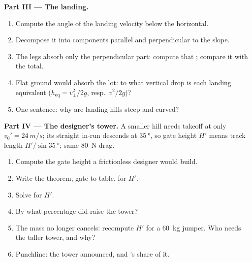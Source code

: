 \begin{problem}
\medskip\noindent\textbf{Part III --- The landing.}
\begin{enumerate}[resume]
  \item Compute the angle of the landing velocity below the horizontal.
  \item Decompose it into components parallel and perpendicular to
        the slope.
  \item The legs absorb only the perpendicular part: compute that
        ; compare it with the total.
  \item Flat ground would absorb the lot: to what vertical drop is
        each landing equivalent ($h_{\text{eq}} = v_\perp^2/2g$,
        resp.\ $v^2/2g$)?
  \item One sentence: why are landing hills steep and curved?
\end{enumerate}

\medskip\noindent\textbf{Part IV --- The designer's tower.}
A smaller hill needs takeoff at only $v_0' = \qty{24}{m/s}$; its
straight in-run descends at $\qty{35}{\degree}$, so gate height $H'$
means track length $H'/\sin\qty{35}{\degree}$; same \qty{80}{N} drag.
\begin{enumerate}[resume]
  \item Compute the gate height a frictionless designer would build.
  \item Write the  theorem, gate to table, for $H'$.
  \item Solve for $H'$.
  \item By what percentage did  raise the tower?
  \item The mass no longer cancels: recompute $H'$ for a
        \qty{60}{kg} jumper. Who needs the taller tower, and why?
  \item Punchline: the tower announced, and 's share of it.
\end{enumerate}
\end{problem}
